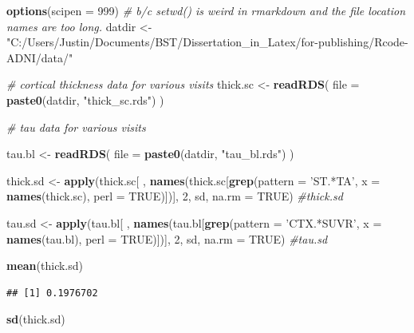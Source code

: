 \documentclass[
]{article}
\newenvironment{Shaded}{\begin{snugshade}}{\end{snugshade}}
\newcommand{\CommentTok}[1]{\textcolor[rgb]{0.56,0.35,0.01}{\textit{#1}}}
\newcommand{\DataTypeTok}[1]{\textcolor[rgb]{0.13,0.29,0.53}{#1}}
\newcommand{\DecValTok}[1]{\textcolor[rgb]{0.00,0.00,0.81}{#1}}
\newcommand{\KeywordTok}[1]{\textcolor[rgb]{0.13,0.29,0.53}{\textbf{#1}}}
\newcommand{\NormalTok}[1]{#1}
\newcommand{\OtherTok}[1]{\textcolor[rgb]{0.56,0.35,0.01}{#1}}
\newcommand{\StringTok}[1]{\textcolor[rgb]{0.31,0.60,0.02}{#1}}
\begin{document}
\begin{Shaded}
\begin{Highlighting}[]
\KeywordTok{options}\NormalTok{(}\DataTypeTok{scipen =} \DecValTok{999}\NormalTok{)}
\CommentTok{# b/c setwd() is weird in rmarkdown and the file location names are too long.}
\NormalTok{datdir <-}\StringTok{ "C:/Users/Justin/Documents/BST/Dissertation_in_Latex/for-publishing/Rcode-ADNI/data/"}

\CommentTok{# cortical thickness data for various visits}
\NormalTok{thick.sc <-}\StringTok{ }\KeywordTok{readRDS}\NormalTok{(}
   \DataTypeTok{file =} \KeywordTok{paste0}\NormalTok{(datdir, }\StringTok{"thick_sc.rds"}\NormalTok{)}
\NormalTok{   )}

\CommentTok{# tau data for various visits}

\NormalTok{tau.bl <-}\StringTok{ }\KeywordTok{readRDS}\NormalTok{(}
   \DataTypeTok{file =} \KeywordTok{paste0}\NormalTok{(datdir, }\StringTok{"tau_bl.rds"}\NormalTok{)}
\NormalTok{   )}

\NormalTok{thick.sd <-}\StringTok{ }\KeywordTok{apply}\NormalTok{(thick.sc[ , }\KeywordTok{names}\NormalTok{(thick.sc[}\KeywordTok{grep}\NormalTok{(}\DataTypeTok{pattern =} \StringTok{'ST.*TA'}\NormalTok{, }
                                            \DataTypeTok{x =} \KeywordTok{names}\NormalTok{(thick.sc),}
                                            \DataTypeTok{perl =} \OtherTok{TRUE}\NormalTok{)])],}
                  \DecValTok{2}\NormalTok{, sd, }\DataTypeTok{na.rm =} \OtherTok{TRUE}\NormalTok{)}
\CommentTok{#thick.sd}

\NormalTok{tau.sd <-}\StringTok{ }\KeywordTok{apply}\NormalTok{(tau.bl[ , }\KeywordTok{names}\NormalTok{(tau.bl[}\KeywordTok{grep}\NormalTok{(}\DataTypeTok{pattern =} \StringTok{'CTX.*SUVR'}\NormalTok{, }
                                            \DataTypeTok{x =} \KeywordTok{names}\NormalTok{(tau.bl),}
                                            \DataTypeTok{perl =} \OtherTok{TRUE}\NormalTok{)])],}
                \DecValTok{2}\NormalTok{, sd, }\DataTypeTok{na.rm =} \OtherTok{TRUE}\NormalTok{)}
\CommentTok{#tau.sd}

\KeywordTok{mean}\NormalTok{(thick.sd)}
\end{Highlighting}
\end{Shaded}

\begin{verbatim}
## [1] 0.1976702
\end{verbatim}

\begin{Shaded}
\begin{Highlighting}[]
\KeywordTok{sd}\NormalTok{(thick.sd)}
\end{Highlighting}
\end{Shaded}
\end{document}
